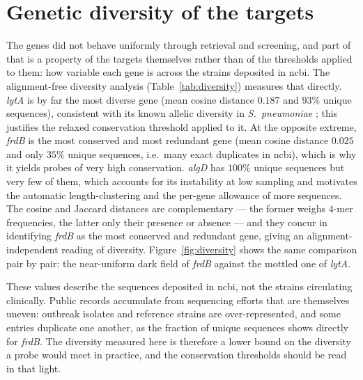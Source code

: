 \section{Genetic diversity of the targets}
\label{sec:diversityres}

The genes did not behave uniformly through retrieval and screening, and part of that is a
property of the targets themselves rather than of the thresholds applied to them: how variable
each gene is across the strains deposited in \acrshort{ncbi}. The alignment-free diversity
analysis (Table~\ref{tab:diversity}) measures that directly. \emph{lytA} is by far the most diverse gene (mean cosine distance
$0.187$ and $93\%$ unique sequences), consistent with its known allelic diversity in
\emph{S.\ pneumoniae} \citep{obregon2002}; this justifies the relaxed conservation threshold
applied to it. At the opposite extreme, \emph{frdB} is the most conserved and most redundant
gene (mean cosine distance $0.025$ and only $35\%$ unique sequences, i.e.\ many exact
duplicates in \acrshort{ncbi}), which is why it yields probes of very high conservation.
\emph{algD} has $100\%$ unique sequences but very few of them, which accounts for its
instability at low sampling and motivates the automatic length-clustering and the per-gene
allowance of more sequences. The cosine and Jaccard distances are complementary --- the former
weighs $4$-mer frequencies, the latter only their presence or absence --- and they concur in
identifying \emph{frdB} as the most conserved and redundant gene, giving an alignment-independent
reading of diversity. Figure~\ref{fig:diversity} shows the same comparison pair by pair: the
near-uniform dark field of \emph{frdB} against the mottled one of \emph{lytA}.

These values describe the sequences deposited in \acrshort{ncbi}, not the strains circulating
clinically. Public records accumulate from sequencing efforts that are themselves uneven: outbreak
isolates and reference strains are over-represented, and some entries duplicate one another, as
the fraction of unique sequences shows directly for \emph{frdB}. The diversity measured here is
therefore a lower bound on the diversity a probe would meet in practice, and the conservation
thresholds should be read in that light.

